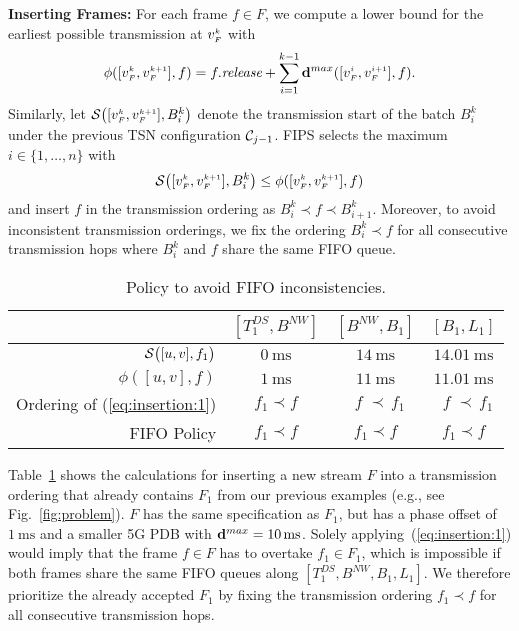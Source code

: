 \textbf{Inserting Frames:}
For each frame $f \in F$, we compute a lower bound for the earliest possible transmission at $\v{k}{F}$ with
\begin{equation*}
  \phi([\v{k}{F}, \v{k+1}{F}], f) = \release{f} + \sum_{i = 1}^{k-1} \dpdbmax{[\v{i}{F}, \v{i+1}{F}], f}.
\end{equation*}
Similarly, let $\S{[\v{k}{F}, \v{k+1}{F}], B_i^k}$ denote the transmission start of the batch $B_i^k$ under the previous TSN configuration $\Conf_{j-1}$.
FIPS selects the maximum $i \in \{1, \ldots, n\}$ with
\begin{equation} \label{eq:insertion:1}
  \S{[\v{k}{F}, \v{k+1}{F}], B_i^k} \leq \phi([\v{k}{F}, \v{k+1}{F}], f)
\end{equation}
and insert $f$ in the transmission ordering as $B_i^k \prec f \prec B_{i+1}^k$.
Moreover, to avoid inconsistent transmission orderings, we fix the ordering $B_i^k \prec f$ for all consecutive transmission hops where $B_i^k$ and $f$ share the same FIFO queue.

\begin{table}
  \centering
  \caption{Policy to avoid FIFO inconsistencies.} \label{tab:inconsistency}
  \begin{tabular}{rccc}
    \toprule
     & $[T_1^{DS}, B^{NW}]$ & $[B^{NW}, B_1]$ & $[B_1, L_1]$ \\
    \midrule
    $\S{[u,v], f_1}$ & $\qty{0}{\ms}$ & $\qty{14}{\ms}$ & $\qty{14.01}{\ms}$ \\
    $\phi([u,v], f)$ & $\qty{1}{\ms}$ & $\qty{11}{\ms}$ & $\qty{11.01}{\ms}$ \\[1.5mm]
    Ordering of (\ref{eq:insertion:1}) & $f_1 \prec f$ & $\;\;f\; \prec \, f_1$ & $\;\;f\; \prec \, f_1$ \\
    FIFO Policy & $f_1 \prec f$ & $f_1 \prec f$ & $f_1 \prec f$ \\
    \bottomrule
  \end{tabular}
\end{table}

Table~\ref{tab:inconsistency} shows the calculations for inserting a new stream $F$ into a transmission ordering that already contains $F_1$ from our previous examples (e.g., see Fig.~\ref{fig:problem}).
$F$ has the same specification as $F_1$, but has a phase offset of $\qty{1}{\ms}$ and a smaller 5G PDB with $\dpdbmax{} = \qty{10}{\ms}$.
Solely applying~(\ref{eq:insertion:1}) would imply that the frame $f \in F$ has to overtake $f_1 \in F_1$, which is impossible if both frames share the same FIFO queues along $[T_1^{DS}, B^{NW}, B_1, L_1]$.
We therefore prioritize the already accepted $F_1$ by fixing the transmission ordering $f_1 \prec f$ for all consecutive transmission hops.


